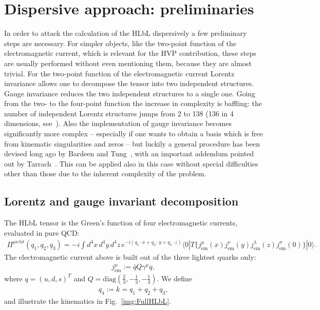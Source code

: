 \documentclass[epj]{webofc}
\newcommand{\<}{\langle}
\renewcommand{\>}{\rangle}
\begin{document}
\section{Dispersive approach: preliminaries}\label{prelim}
In order to attack the calculation of the HLbL dispersively a few
preliminary steps are necessary. For simpler objects, like the two-point
function of the electromagnetic current, which is relevant for the HVP
contribution, these steps are usually performed without even mentioning
them, because they are almost trivial. For the two-point function of the
electromagnetic current Lorentz invariance allows one to decompose the
tensor into two independent structures. Gauge invariance reduces the two
independent structures to a single one. Going from the two- to the
four-point function the increase in complexity is baffling: the number of
independent Lorentz structures jumps from 2 to 138 (136 in 4 dimensions,
see~\cite{Eichmann:2015nra}). Also the implementation of gauge invariance
becomes significantly more complex -- especially if one wants to obtain a
basis which is free from kinematic singularities and zeros -- but luckily a
general procedure has been devised long ago by Bardeen and
Tung~\cite{Bardeen:1969aw}, with an important addendum pointed out by
Tarrach~\cite{Tarrach:1975tu}. This can be applied also in this case
without special difficulties other than those due to the inherent
complexity of the problem. 

\subsection{Lorentz and gauge invariant decomposition}\label{BTT}

The HLbL tensor is the Green's function of four electromagnetic
currents, evaluated in pure QCD: 
\begin{align}
	\label{eq:HLbLTensorDefinition}
	\Pi^{\mu\nu\lambda\sigma}(q_1,q_2,q_3) = -i \int d^4x \, d^4y \, d^4z \, e^{-i(q_1 \cdot x + q_2 \cdot y + q_3 \cdot z)} \< 0 | T \{ j_\mathrm{em}^\mu(x) j_\mathrm{em}^\nu(y) j_\mathrm{em}^\lambda(z) j_\mathrm{em}^\sigma(0) \} | 0 \> .
\end{align}
The electromagnetic current above is built out of the three lightest quarks
only:
\begin{align}
	j_\mathrm{em}^\mu := \bar q Q \gamma^\mu q ,
\end{align}
where $q = ( u , d, s )^T$ and $Q = \mathrm{diag}(\frac{2}{3}, -\frac{1}{3}, -\frac{1}{3})$.
We define
\begin{align}
	q_4 := k = q_1 + q_2 + q_3 ,
\end{align}
and illustrate the kinematics in Fig.~\ref{img:FullHLbL}.
\end{document}
